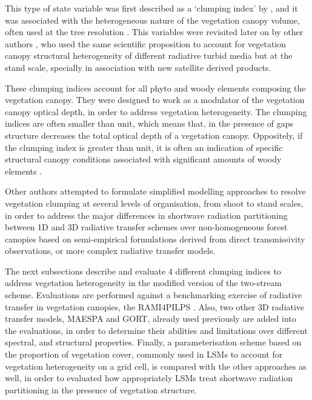 This type of state variable was first described as a `clumping index' by \citet{Nilson1971}, and it was associated with the heterogeneous nature of the vegetation canopy volume, often used at the tree resolution \citep{Norman1974,chen1992,Chen1996}. This variables were revisited later on by other authors \citep{Pinty2004,pinty2006}, who used the same scientific proposition to account for vegetation canopy structural heterogeneity of different radiative turbid media but at the stand scale, specially in association with new satellite derived products.

These clumping indices account for all phyto and woody elements composing the vegetation canopy. They were designed to work as a modulator of the vegetation canopy optical depth, in order to address vegetation heterogeneity. The clumping indices are often smaller than unit, which means that, in the presence of gaps structure decreases the total optical depth of a vegetation canopy. Oppositely, if the clumping index is greater than unit, it is often an indication of specific structural canopy conditions associated with significant amounts of woody elements \citep{pinty2006}.

Other authors \citep{Kucharik1999,Ni-Meister2010} attempted to formulate simplified modelling approaches to resolve vegetation clumping at several levels of organisation, from shoot to stand scales, in order to address the major differences in shortwave radiation partitioning between 1D and 3D radiative transfer schemes over non-homogeneous forest canopies based on semi-empirical formulations derived from direct transmissivity observations, or more complex radiative transfer models.

The next subsections describe and evaluate 4 different clumping indices to address vegetation heterogeneity in the modified version of the two-stream scheme. Evaluations are performed against a benchmarking exercise of radiative transfer in vegetation canopies, the RAMI4PILPS \citep{Widlowski2011}. Also, two other 3D radiative transfer models, MAESPA and GORT, already used previously are added into the evaluations, in order to determine their abilities and limitations over different spectral, and structural properties. Finally, a parameterisation scheme based on the proportion of vegetation cover, commonly used in LSMs to account for vegetation heterogeneity on a grid cell, is compared with the other approaches as well, in order to evaluated how appropriately LSMs treat shortwave radiation partitioning in the presence of vegetation structure.

